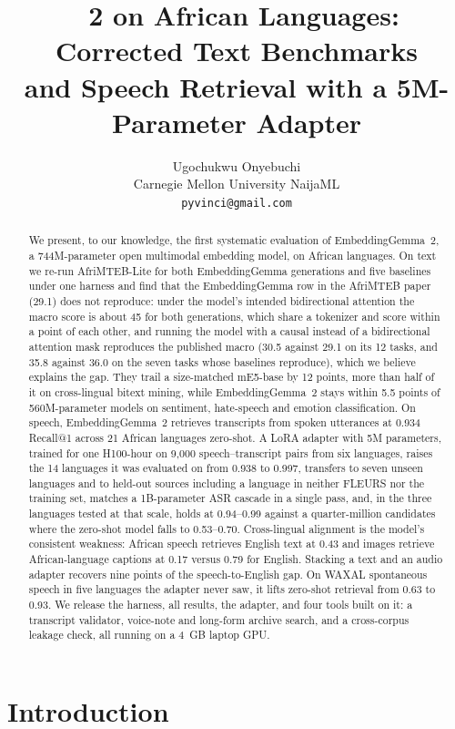 \documentclass[11pt]{article}
\title{\eg{}~2 on African Languages: Corrected Text Benchmarks\\
and Speech Retrieval with a 5M-Parameter Adapter}
\author{Ugochukwu Onyebuchi \\
  Carnegie Mellon University \quad NaijaML \\
  \texttt{pyvinci@gmail.com}}
\newcommand{\eg}{EmbeddingGemma}
\newcommand{\egtwo}{EmbeddingGemma~2}
\begin{document}
\maketitle

\begin{abstract}
We present, to our knowledge, the first systematic evaluation of \egtwo{}, a 744M-parameter open
multimodal embedding model, on African languages. On text we re-run
AfriMTEB-Lite for both \eg{} generations and five baselines under one harness
and find that the \eg{} row in the AfriMTEB paper (29.1) does not reproduce:
under the model's intended bidirectional attention the macro score is about 45 for both generations, which share a tokenizer and score within a point of each other, and running the model with a causal instead of a
bidirectional attention mask reproduces the published macro (30.5 against 29.1 on its 12 tasks, and 35.8 against 36.0 on the seven tasks whose baselines reproduce), which we believe explains the gap. They trail a size-matched mE5-base by 12 points, more than half of it on cross-lingual bitext mining, while \egtwo{} stays within 5.5 points of 560M-parameter models on sentiment, hate-speech and emotion classification. On speech, \egtwo{} retrieves transcripts
from spoken utterances at 0.934 Recall@1 across 21 African languages zero-shot.
A LoRA adapter with 5M parameters, trained for one H100-hour on 9,000
speech--transcript pairs from six languages, raises the 14 languages it was evaluated on from 0.938 to 0.997, transfers to
seven unseen languages and to held-out sources including a language in neither
FLEURS nor the training set, matches a 1B-parameter ASR cascade in a single
pass, and, in the three languages tested at that scale, holds at 0.94--0.99 against a quarter-million candidates where the zero-shot model falls to 0.53--0.70. Cross-lingual alignment is the
model's consistent weakness: African speech retrieves English text at 0.43 and
images retrieve African-language captions at 0.17 versus 0.79 for English.
Stacking a text and an audio adapter recovers nine points of the speech-to-English gap. On
WAXAL spontaneous speech in five languages the adapter never saw, it lifts
zero-shot retrieval from 0.63 to 0.93. We release the harness, all results, the
adapter, and four tools built on it: a transcript validator, voice-note and
long-form archive search, and a cross-corpus leakage check, all running on a
4~GB laptop GPU.
\end{abstract}

\section{Introduction}
\end{document}
